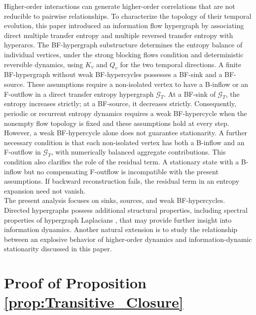 \documentclass{comnet}%
\begin{document}
Higher-order interactions can generate higher-order correlations that are not reducible to pairwise relationships. To characterize the topology of their temporal evolution, this paper introduced an information flow hypergraph by associating direct multiple transfer entropy and multiple reversed transfer entropy with hyperarcs. The BF-hypergraph substructure determines the entropy balance of 
individual vertices, under the strong blocking flows condition and deterministic reversible dynamics, using $K_v$ and $Q_v$ for the two temporal directions. A finite BF-hypergraph without weak BF-hypercycles possesses a BF-sink and a BF-source. These assumptions require a non-isolated vertex to have a B-inflow or an F-outflow in a direct transfer entropy hypergraph $\mathcal{G}_{T}$. At a BF-sink of $\mathcal{G}_{T}$, the entropy increases strictly; at a BF-source, it decreases strictly. Consequently, periodic or recurrent entropy dynamics requires a weak BF-hypercycle when the nonempty flow topology is fixed and these assumptions hold at every step. However, a weak BF-hypercycle alone does not guarantee stationarity. A further necessary condition is that each non-isolated vertex has both a B-inflow and an F-outflow in $\mathcal{G}_{T}$, with numerically balanced aggregate contributions. This condition also clarifies the role of the residual term. A stationary state with a B-inflow but no compensating F-outflow is incompatible with the present assumptions. If backward reconstruction fails, the residual term in an entropy expansion need not vanish.\\

The present analysis focuses on sinks, sources, and weak BF-hypercycles. Directed hypergraphs possess additional structural properties, including spectral properties of hypergraph Laplacians \cite{Jost2019}, that may provide further insight into information dynamics. Another natural extension is to study the relationship between an explosive behavior of higher-order dynamics \cite{Battiston2021} and information-dynamic stationarity discussed in this paper.\\


\appendix
\renewcommand{\theequation}{\thesection.\arabic{equation}}
\section{\label{app:Proof_Transitive} Proof of Proposition \ref{prop:Transitive_Closure}}
\end{document}
